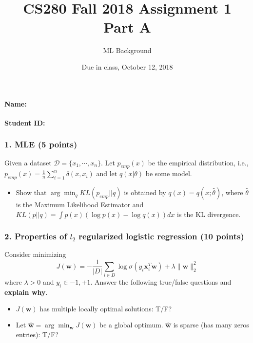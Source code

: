 \documentclass[12pt]{article}%
\begin{document}
\title{CS280 Fall 2018 Assignment 1 \\ Part A}
\author{ML Background}
\date{Due in class, October 12, 2018}
\maketitle

\paragraph{Name:}

\paragraph{Student ID:}

\newpage


\subsubsection*{1. MLE (5 points)}
Given a dataset $\mathcal{D} = \{x_1,\cdots, x_n\}$. Let $p_{emp}(x)$ be the empirical distribution, i.e., $p_{emp}(x)=\frac{1}{n}\sum_{i=1}^n\delta(x,x_i) $ and let $q(x|\theta)$ be some model.  
\begin{itemize}
	\item Show that $\arg\min_q KL(p_{emp}||q)$ is obtained by $q(x)=q(x;\hat{\theta})$, where $\hat{\theta}$ is the Maximum Likelihood Estimator and $KL(p||q)=\int p(x)(\log p(x)- \log q(x))dx$ is the KL divergence.
\end{itemize}





\newpage

\newpage


\subsubsection*{2. Properties of $l_2$ regularized logistic regression (10 points)}
Consider minimizing
\[
J(\mathbf{w}) = -\frac{1}{|D|}\sum_{i\in D} \log \sigma(y_i\mathbf{x}_i^T\mathbf{w})+\lambda\|\mathbf{w}\|_2^2
\]
where $ \lambda>0 $ and $y_i\in {-1,+1}$. Answer the following true/false questions and \textbf{explain why}.
\begin{itemize}
\item $J(\mathbf{w})$ has multiple locally optimal solutions: T/F?
\item Let $\hat{\mathbf{w}}=\arg\min_{\mathbf{w}}J(\mathbf{w})$ be a global optimum. $\hat{\mathbf{w}}$ is sparse (has many zeros entries): T/F?
\end{itemize}
\end{document}
